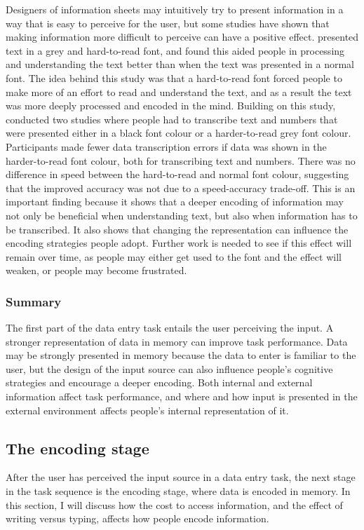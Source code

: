 \documentclass[11pt,oneside]{report}
\begin{document}
Designers of information sheets may intuitively try to present information in a way that is easy to perceive for the user, but some studies have shown that making information more difficult to perceive can have a positive effect.
\citet{Diemand-Yauman2011} presented text in a grey and hard-to-read font, and found this aided people in processing and understanding the text better than when the text was presented in a normal font. The idea behind this study was that a hard-to-read font forced people to make more of an effort to read and understand the text, and as a result the text was more deeply processed and encoded in the mind. Building on this study, \citet{Soboczenski2013} conducted two studies where people had to transcribe text and numbers that were presented either in a black font colour or a harder-to-read grey font colour. Participants made fewer data transcription errors if data was shown in the harder-to-read font colour, both for transcribing text and numbers. There was no difference in speed between the hard-to-read and normal font colour, suggesting that the improved accuracy was not due to a speed-accuracy trade-off. This is an important finding because it shows that a deeper encoding of information may not only be beneficial when understanding text, but also when information has to be transcribed. It also shows that changing the representation can influence the encoding strategies people adopt.
Further work is needed to see if this effect will remain over time, as people may either get used to the font and the effect will weaken, or people may become frustrated. 

\subsubsection{Summary}
The first part of the data entry task entails the user perceiving the input.  A stronger representation of data in memory can improve task performance. Data may be strongly presented in memory because the data to enter is familiar to the user, but the design of the input source can also influence people's cognitive strategies and encourage a deeper encoding. Both internal and external information affect task performance, and where and how input is presented in the external environment affects people's internal representation of it. 

\subsection{The encoding stage}\label{sec:Encoding_stage}
After the user has perceived the input source in a data entry task, the next stage in the task sequence is the encoding stage, where data is encoded in memory. In this section, I will discuss how the cost to access information, and the effect of writing versus typing, affects how people encode information.
\end{document}
